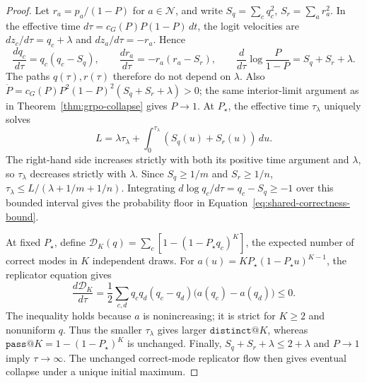 \documentclass{article}
\newcommand{\1}{\mathbf 1}
\theoremstyle{remark}
\theoremstyle{definition}
\theoremstyle{plain}
\begin{document}
\begin{proof}
Let $r_a=p_a/(1-P)$ for $a\in\mathcal N$, and write
$S_q=\sum_cq_c^2$, $S_r=\sum_ar_a^2$. In the effective time
$d\tau=c_G(P)P(1-P)\,dt$, the logit velocities are
$dz_c/d\tau=q_c+\lambda$ and $dz_a/d\tau=-r_a$. Hence
\begin{equation}
 \frac{dq_c}{d\tau}=q_c(q_c-S_q),\qquad
 \frac{dr_a}{d\tau}=-r_a(r_a-S_r),\qquad
 \frac{d}{d\tau}\log\frac{P}{1-P}=S_q+S_r+\lambda.
 \label{eq:shared-correctness-clock}
\end{equation}
The paths $q(\tau),r(\tau)$ therefore do not depend on $\lambda$.
Also $\dot P=c_G(P)P^2(1-P)^2(S_q+S_r+\lambda)>0$; the same interior-limit
argument as in Theorem~\ref{thm:grpo-collapse} gives $P\to1$.
At $P_\star$, the effective time $\tau_\lambda$ uniquely solves
\[
 L=\lambda\tau_\lambda+
   \int_0^{\tau_\lambda}(S_q(u)+S_r(u))\,du.
\]
The right-hand side increases strictly with both its positive time argument
and $\lambda$, so $\tau_\lambda$ decreases strictly with $\lambda$.
Since $S_q\ge1/m$ and $S_r\ge1/n$,
$\tau_\lambda\le L/(\lambda+1/m+1/n)$. Integrating
$d\log q_c/d\tau=q_c-S_q\ge-1$ over this bounded interval gives the probability
floor in Equation~\eqref{eq:shared-correctness-bound}.

At fixed $P_\star$, define
$\mathcal D_K(q)=\sum_c[1-(1-P_\star q_c)^K]$, the expected number of correct modes in
$K$ independent draws. For
$a(u)=KP_\star(1-P_\star u)^{K-1}$, the replicator equation gives
\[
 \frac{d\mathcal D_K}{d\tau}
 =\frac12\sum_{c,d}q_cq_d(q_c-q_d)\bigl(a(q_c)-a(q_d)\bigr)\le0.
\]
The inequality holds because $a$ is nonincreasing; it is strict for $K\ge2$
and nonuniform $q$. Thus the smaller $\tau_\lambda$ gives larger
$\texttt{distinct@}K$, whereas
$\texttt{pass@}K=1-(1-P_\star)^K$ is unchanged. Finally,
$S_q+S_r+\lambda\le2+\lambda$ and $P\to1$ imply $\tau\to\infty$.
The unchanged correct-mode replicator flow then gives eventual collapse
under a unique initial maximum.
\end{proof}
\end{document}
